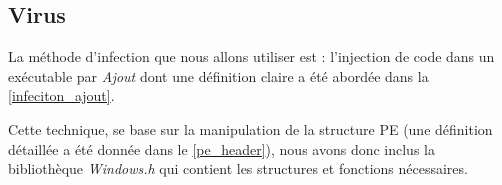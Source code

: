 
    \subsection{Virus} \label{virus_infecteur}
    La méthode d’infection que nous allons utiliser est : l’injection de code dans un exécutable par \emph{Ajout}
    dont une définition claire a été abordée dans la \autoref{infeciton_ajout}.

    Cette technique, se base sur la manipulation de la structure PE (une définition détaillée a été donnée dans le 
    \autoref{pe_header}), nous avons donc inclus la bibliothèque \emph{Windows.h} qui contient les 
    structures et fonctions nécessaires.

